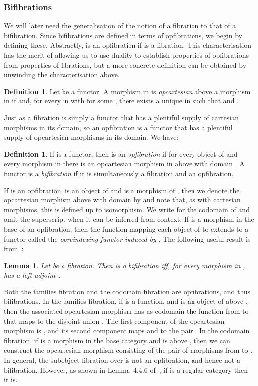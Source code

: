 \documentclass{LMCS}
\theoremstyle{plain}
\newtheorem{lemma}[theorem]{Lemma}
\theoremstyle{remark}
\theoremstyle{definition}
\newtheorem{definition}[theorem]{Definition}
\begin{document}
\subsubsection{Bifibrations}

We will later need the generalisation of the notion of a fibration to
that of a bifibration. Since bifibrations are defined in terms of
opfibrations, we begin by defining these. Abstractly, 
is an opfibration if  is a fibration. This
characterisation has the merit of allowing us to use duality to
establish properties of opfibrations from properties of fibrations,
but a more concrete definition can be obtained by unwinding the
characterisation above.

\begin{definition}
  Let  be a functor. A morphism  in 
  is {\em opcartesian} above a morphism  in  if  and, for every  in  with  for
  some , there exists a unique  in 
  such that  and .
\end{definition}
\noindent
Just as a fibration is simply a functor that has a plentiful supply
of cartesian morphisms in its domain, so an opfibration is a functor
that has a plentiful supply of opcartesian morphisms in its
domain. We have:

\begin{definition}
  If  is a functor, then  is an {\em opfibration} if
  for every object  of  and every morphism  in
   there is an opcartesian morphism in  above  with domain
  .  A functor  is a {\em bifibration} if it is simultaneously a
  fibration and an opfibration.
\end{definition}
If  is an opfibration,  is an object of  and 
is a morphism of , then we denote the opcartesian morphism above
 with domain  by  and note that, as with cartesian
morphisms, this is defined up to isomorphism. We write  for
the codomain of  and omit the superscript  when it can be
inferred from context.  If  is a morphism in the base of an
opfibration, then the function mapping each object  of  to
 extends to a functor  called
the {\em opreindexing functor induced by }. The following useful
result is from~\cite{jac93}:
\begin{lemma}\label{lem:bifdef}
  Let  be a fibration. Then  is a bifibration iff,
  for every morphism  in ,  has a left adjoint
  .
\end{lemma}

Both the families fibration and the codomain fibration are
opfibrations, and thus bifibrations. In the families fibration, if
 is a function, and  is an object of
 above , then the associated opcartesian morphism has
as codomain the function from  to  that maps  to the
disjoint union . The first
component of the opcartesian morphism is , and its second component
maps  and  to the pair .  In the codomain
fibration, if  is a morphism in the base category and  is above , then we can construct the opcartesian morphism
consisting of the pair of morphisms  from  to . In
general, the subobject fibration over  is not an opfibration, and
hence not a bifibration. However, as shown in Lemma~4.4.6
of~\cite{jac99}, if  is a regular category then it is.
\end{document}
